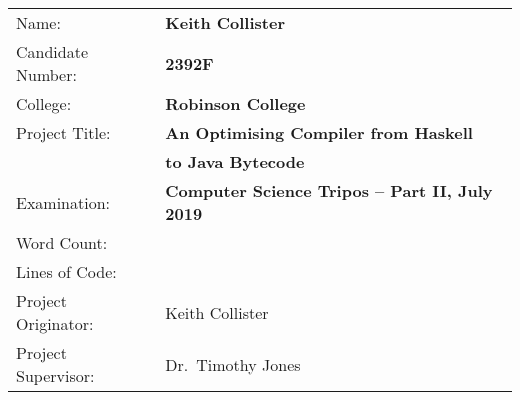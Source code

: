 \documentclass[dissertation.tex]{subfiles}
\begin{document}
{\large
\begin{tabular}{ll}
Name:               & \textbf{Keith Collister} \\
Candidate Number:   & \textbf{2392F} \\
College:            & \textbf{Robinson College} \\
Project Title:      & \textbf{An Optimising Compiler from Haskell} \\
                    & \textbf{to Java Bytecode} \\
Examination:        & \textbf{Computer Science Tripos -- Part II, July 2019} \\
Word Count:         & \textbf{} \\
Lines of Code:      & \textbf{} \\
Project Originator: & Keith Collister \\
Project Supervisor: & Dr.\ Timothy Jones \\ 
\end{tabular}
}
\end{document}
